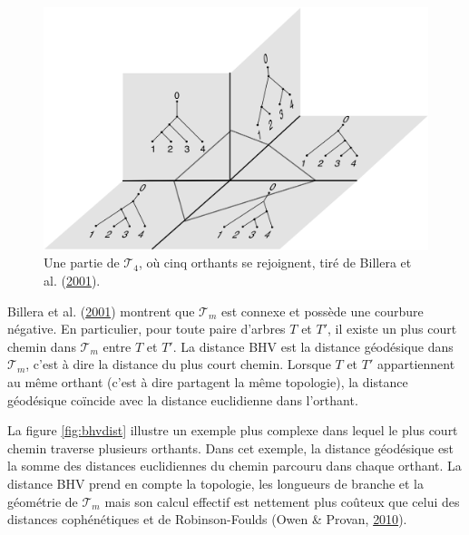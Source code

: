 \documentclass[12pt,a4paper]{reedthesis}
\theoremstyle{definition}
\theoremstyle{definition}
\theoremstyle{definition}
\theoremstyle{remark}
\begin{document}
\begin{figure}

{\centering \includegraphics[width=0.9\linewidth]{img/bhv_orthants} 

}

\caption{Une partie de \(\mathscr{T}_4\), où cinq orthants se rejoignent, tiré de Billera et al. (\protect\hyperlink{ref-billera2001geometry}{2001}).}\label{fig:bhvorthants}
\end{figure}
Billera et al. (\protect\hyperlink{ref-billera2001geometry}{2001}) montrent que \(\mathscr{T}_m\) est connexe et possède une courbure négative. En particulier, pour toute paire d'arbres \(T\) et \(T'\), il existe un plus court chemin dans \(\mathscr{T}_m\) entre \(T\) et \(T'\). La distance BHV est la distance géodésique dans \(\mathscr{T}_m\), c'est à dire la distance du plus court chemin. Lorsque \(T\) et \(T'\) appartiennent au même orthant (c'est à dire partagent la même topologie), la distance géodésique coïncide avec la distance euclidienne dans l'orthant.

La figure \ref{fig:bhvdist} illustre un exemple plus complexe dans lequel le plus court chemin traverse plusieurs orthants. Dans cet exemple, la distance géodésique est la somme des distances euclidiennes du chemin parcouru dans chaque orthant. La distance BHV prend en compte la topologie, les longueurs de branche et la géométrie de \(\mathscr{T}_m\) mais son calcul effectif est nettement plus coûteux que celui des distances cophénétiques et de Robinson-Foulds (Owen \& Provan, \protect\hyperlink{ref-owen2010fast}{2010}).
\end{document}
